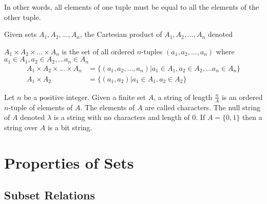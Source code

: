 \documentclass[11pt]{article}
\begin{document}
In other words, all elements of one tuple must be equal to all the elements of the other tuple.

\begin{definition}\label{def:cartesian-product}
    Given sets $A_1, A_2, ..., A_n$, the Cartesian product of $A_1, A_2, ..., A_n$
    denoted

    $A_1 \times A_2 \times ... \times A_n$ is the set of all ordered $n$-tuples
    $(a_1, a_2, ..., a_n)$ where $a_1 \in A_1, a_2 \in A_2, ... a_n \in A_n$
    \begin{equation}
        \begin{aligned}
            A_1 \times A_2 \times ... \times A_n &= \{ (a_1, a_2, ..., a_n) | a_1 \in A_1, a_2 \in A_2, ... a_n \in A_n \} \\
            A_1 \times A_2 &= \{ (a_1, a_2) | a_1 \in A_1, a_2 \in A_2 \}
        \end{aligned}
    \end{equation}
\end{definition}

\begin{definition}[Strings]\label{def:string}
    Let $n$ be a positive integer. Given a finite set $A$, a string
    of length $\frac{n}{A}$ is an ordered $n$-tuple of elements of $A$.
    The elements of $A$ are called characters. The null string of $A$
    denoted $\lambda$ is a string with no characters and length of $0$.
    If $A = \{0, 1\}$ then a string over $A$ is a bit string.
\end{definition}

\section{Properties of Sets}

\subsection{Subset Relations}
\end{document}
